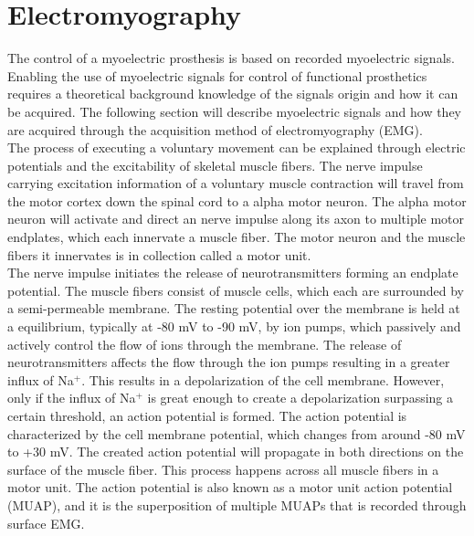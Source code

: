 \section{Electromyography}

The control of a myoelectric prosthesis is based on recorded myoelectric signals. \cite{Geethanjali2016}  Enabling the use of myoelectric signals for control of functional prosthetics requires a theoretical background knowledge of the signals origin and how it can be acquired. The following section will describe myoelectric signals and how they are acquired through the acquisition method of electromyography (EMG).   \\
The process of executing a voluntary movement can be explained through electric potentials and the excitability of skeletal muscle fibers. The nerve impulse carrying excitation information of a voluntary muscle contraction will travel from the motor cortex down the spinal cord to a alpha motor neuron. The alpha motor neuron will activate and direct an nerve impulse along its axon to multiple motor endplates, which each innervate a muscle fiber. The motor neuron and the muscle fibers it innervates is in collection called a motor unit. \cite{Turker2013} \\
The nerve impulse initiates the release of neurotransmitters forming an endplate potential. The muscle fibers consist of muscle cells, which each are surrounded by a semi-permeable membrane. The resting potential over the membrane is held at a equilibrium, typically at -80 mV to -90 mV, by ion pumps, which passively and actively control the flow of ions through the membrane. The release of neurotransmitters affects the flow through the ion pumps resulting in a greater influx of Na$^+$. This results in a depolarization of the cell membrane. However, only if the influx of Na$^+$ is great enough to create a depolarization surpassing a certain threshold, an action potential is formed. The action potential is characterized by the cell membrane potential, which changes from around -80 mV to +30 mV. %
The created action potential will propagate in both directions on the surface of the muscle fiber. This process happens across all muscle fibers in a motor unit. The action potential is also known as a motor unit action potential (MUAP), and it is the superposition of multiple MUAPs that is recorded through surface EMG. \cite{Turker2013,Martini2012} \\
